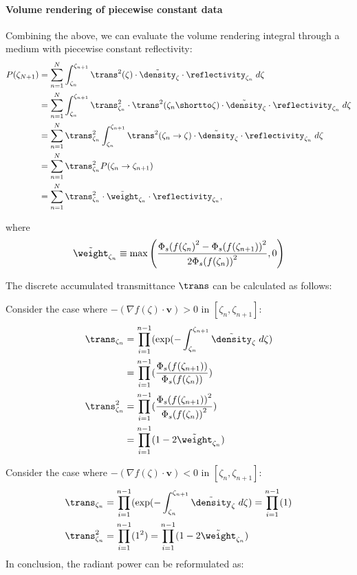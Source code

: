 \paragraph{Volume rendering of piecewise constant data}
Combining the above, we can evaluate the volume rendering integral through a medium with piecewise constant reflectivity:
% 
\begin{align}
P(\zeta_{N+1}) &= \sum_{n=1}^N \int_{\zeta_n}^{\zeta_{n+1}} \trans^2(\zeta) \cdot \tilde{\density}_{\zeta} \cdot \reflectivity_{\zeta_n} \; d\zeta
\\
&= \sum_{n=1}^N \int_{\zeta_n}^{\zeta_{n+1}} \trans^2_{\zeta_n} \cdot \trans^2(\zeta_n \shortto \zeta) \cdot \tilde{\density}_{\zeta} \cdot \reflectivity_{\zeta_n} \; d\zeta 
\\
&= \sum_{n=1}^N \trans^2_{\zeta_n}  \int_{\zeta_n}^{\zeta_{n+1}} \trans^2(\zeta_n \rightarrow \zeta) \cdot \tilde{\density}_{\zeta} \cdot \reflectivity_{\zeta_n} \; d\zeta \\
&=\sum_{n=1}^N \trans^2_{\zeta_n} P(\zeta_n \rightarrow \zeta_{n+1})
\\
&= \sum_{n=1}^N \trans^2_{\zeta_n} \cdot \tilde{\weight}_{\zeta_n} \cdot \reflectivity_{\zeta_n},
\end{align}

where 
\begin{align}
\tilde{\weight}_{\zeta_n} \equiv \max\left(\frac{{\Phi_s(f(\zeta_n)}^2 -{\Phi_s(f(\zeta_{n+1}))}^2}{{2\Phi_s(f(\zeta_n))}^2},0\right)
\end{align}

The discrete accumulated transmittance $\trans$ can be calculated as follows:

Consider the case where $-(\nabla f(\zeta)\cdot \mathbf{v}) > 0$ in $[\zeta_n, \zeta_{n+1}]$: 
%
\begin{align}
\trans_{\zeta_n} 
&=\prod_{i=1}^{n-1}(\exp(-\int_{\zeta_n}^{\zeta_{n+1}}\tilde{\density}_\zeta \; d\zeta) \\
&= \prod_{i=1}^{n-1}(\frac{\Phi_s(f(\zeta_{n+1}))}{\Phi_s(f(\zeta_n))})\\
\trans^2_{\zeta_n}
&= \prod_{i=1}^{n-1}(\frac{{\Phi_s(f(\zeta_{n+1}))}^2}{{\Phi_s(f(\zeta_n))}^2})\\
&= \prod_{i=1}^{n-1}(1-2\tilde{\weight}_{\zeta_n})
\label{eq:dicrete_transmittance}
\end{align}

Consider the case where $-(\nabla f(\zeta)\cdot \mathbf{v}) < 0$ in $[\zeta_n, \zeta_{n+1}]$: 
\begin{align}
\trans_{\zeta_n} 
&=\prod_{i=1}^{n-1}(\exp(-\int_{\zeta_n}^{\zeta_{n+1}}\tilde{\density}_\zeta \; d\zeta) = \prod_{i=1}^{n-1}(1)
\\
\trans^2_{\zeta_n} &= \prod_{i=1}^{n-1}(1^2) = \prod_{i=1}^{n-1}(1-2\tilde{\weight}_{\zeta_n})
\end{align}
In conclusion, the radiant power can be reformulated as:


